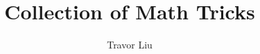 \documentclass[12pt]{article}
\title{Collection of Math Tricks}
\author{Travor Liu}
\begin{document}
\maketitle





\pagebreak

\pagebreak

\pagebreak

\pagebreak

\pagebreak

\pagebreak

\end{document}
